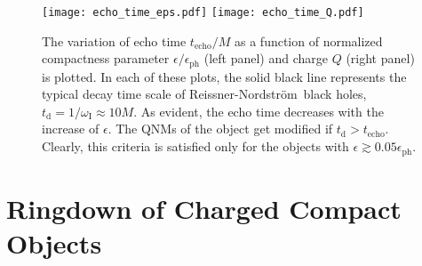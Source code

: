 \documentclass[aps,prd,twocolumn,floatfix,noshowpacs,tightenlines,noshowkeys,superscriptaddress,amsmath,amssymb,
nofootinbib]{revtex4-1}
\renewcommand\[{\begin{equation}}
\renewcommand\]{\end{equation}}
\def\RN{Reissner-Nordstr\"{o}m}
\begin{document}
\begin{figure*}[t]
	\centering
	\texttt{[image: echo\_time\_eps.pdf]}
	\endminipage\hfill
	\texttt{[image: echo\_time\_Q.pdf]}
	\endminipage
	\caption{ The variation of echo time $t_{\textrm{echo}}/M$ as a function of normalized compactness parameter $\epsilon/\epsilon_{\textrm{ph}}$ (left panel) and charge $Q$ (right panel) is plotted. In each of these plots, the solid black line represents the typical decay time scale of \RN\ black holes, $t_{\textrm{d}}= 1/\omega_{\textrm{I}}\approx 10 M$. As evident, the echo time decreases with the increase of $\epsilon$. The QNMs of the object get modified if $t_{\textrm{d}}>t_{\textrm{echo}}$. Clearly, this criteria is satisfied only for  the objects with $\epsilon\gtrsim 0.05\epsilon_{\textrm{ph}}$.}\label{echo_time}
\end{figure*}

\section{Ringdown of Charged Compact Objects}\label{Sec_Ringdown}
\end{document}
